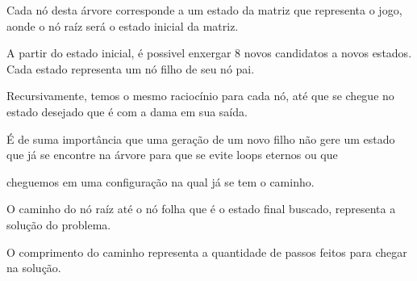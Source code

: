 \documentclass[letterpaper,10pt,openany,oneside,portuges]{sphinxmanual}
\begin{document}
\begin{DUlineblock}{0em}
\item[] 
\end{DUlineblock}
\begin{figure}[htbp]
\centering

\noindent{}
\end{figure}

\begin{DUlineblock}{0em}
\item[] Cada nó desta árvore corresponde a um estado da matriz que representa o jogo, aonde o nó raíz será o estado inicial da matriz.
\item[] A partir do estado inicial, é possivel enxergar 8 novos candidatos a novos estados. Cada estado representa um nó filho de seu nó pai.
\item[] Recursivamente, temos o mesmo raciocínio para cada nó, até que se chegue no estado desejado que é com a dama em sua saída.
\item[] É de suma importância que uma geração de um novo filho não gere um estado que já se encontre na árvore para que se evite loops eternos ou que
\end{DUlineblock}

cheguemos em uma configuração na qual já se tem o caminho.

\begin{DUlineblock}{0em}
\item[] O caminho do nó raíz até o nó folha que é o estado final buscado, representa a solução do problema.
\end{DUlineblock}
\begin{figure}[htbp]
\centering

\noindent{}
\end{figure}

\begin{DUlineblock}{0em}
\item[] O comprimento do caminho representa a quantidade de passos feitos para chegar na solução.
\end{DUlineblock}

\begin{DUlineblock}{0em}
\item[] 
\item[] 
\item[] 
\item[] 
\item[] 
\item[] 
\item[] 
\end{DUlineblock}
\end{document}
